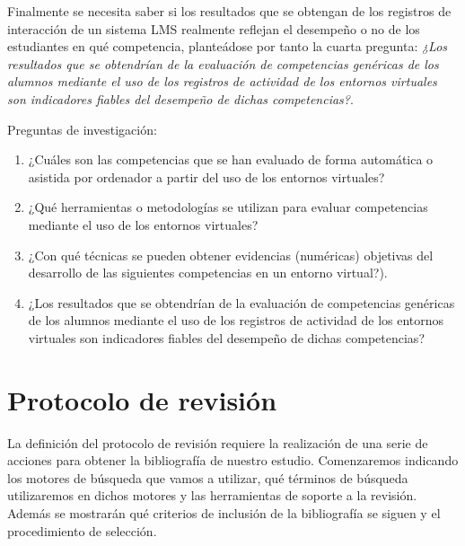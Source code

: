 Finalmente se necesita saber si los resultados que se obtengan de los registros de interacción de un sistema LMS realmente reflejan el desempeño o no de los estudiantes en qué competencia, planteádose por tanto la cuarta pregunta: \emph{¿Los resultados que se obtendrían de la evaluación de competencias genéricas de los alumnos mediante el uso de los registros de actividad de los entornos virtuales son indicadores fiables del desempeño de dichas competencias?}.

\bigskip
Preguntas de investigación:
\begin{enumerate}
\item ¿Cuáles son las competencias que se han evaluado de forma automática o asistida por ordenador a partir del uso de los entornos virtuales?
\item ¿Qué herramientas o metodologías se utilizan para evaluar competencias mediante el uso de los entornos virtuales?
\item ¿Con qué técnicas se pueden obtener evidencias (numéricas) objetivas del desarrollo de las siguientes competencias en un entorno virtual?).
\item ¿Los resultados que se obtendrían de la evaluación de competencias genéricas de los alumnos mediante el uso de los registros de actividad de los entornos virtuales son indicadores fiables del desempeño de dichas competencias?
\end{enumerate}

\section{Protocolo de revisión}

La definición del protocolo de revisión requiere la realización de una serie de acciones para obtener la bibliografía de nuestro estudio. Comenzaremos indicando los motores de búsqueda que vamos a utilizar, qué términos de búsqueda utilizaremos en dichos motores y las herramientas de soporte a la revisión. Además se mostrarán qué criterios de inclusión de la bibliografía se siguen y el procedimiento de selección.

